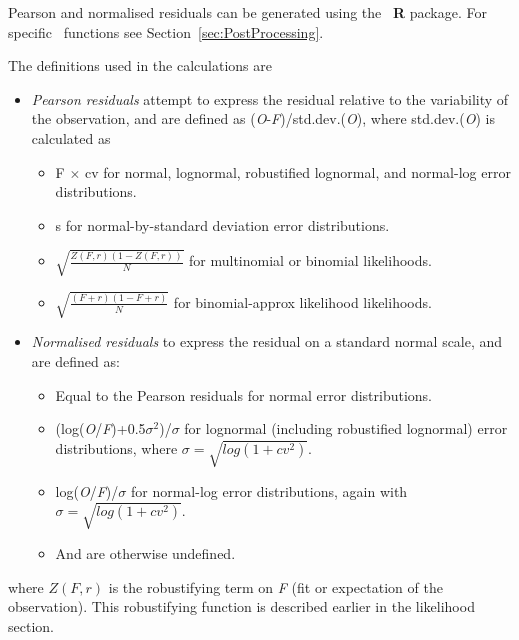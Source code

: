 Pearson and normalised residuals can be generated using the \CNAME\ \textbf{R} package. For specific \R\ functions see Section~\ref{sec:PostProcessing}.

The definitions used in the calculations are

\begin{itemize}
	\item \textit{Pearson residuals} attempt to express the residual relative to the variability of the observation, and are defined as (\textit{O}-\textit{F})/std.dev.(\textit{O}), where std.dev.(\textit{O}) is calculated as
	\begin{itemize}
			\item F $\times$ cv for normal, lognormal, robustified lognormal, and normal-log error distributions.
			\item s for normal-by-standard deviation error distributions.
			\item $\sqrt{\frac{Z(\textit{F},r)(1 - Z(\textit{F},r))}{N}}$ for multinomial or binomial likelihoods.
			\item $\sqrt{\frac{(\textit{F} + r)(1 - \textit{F} + r)}{N}}$ for binomial-approx likelihood likelihoods.
	\end{itemize}
	\item \textit{Normalised residuals} to express the residual on a standard normal scale, and are defined as:
	\begin{itemize}
		\item Equal to the Pearson residuals for normal error distributions.
		\item (log(\textit{O}/\textit{F})+0.5$\sigma^2$)/$\sigma$ for lognormal (including robustified lognormal) error distributions, where $\sigma= \sqrt{log(1 + cv^2)}$.
		\item  log(\textit{O}/\textit{F})/$\sigma$ for normal-log error distributions, again with $\sigma= \sqrt{log(1 + cv^2)}$.
		\item And are otherwise undefined.
	\end{itemize}
\end{itemize}

where $Z(\textit{F},r)$ is the robustifying term on \textit{F} (fit or expectation of the observation). This robustifying function is described earlier in the likelihood section.

